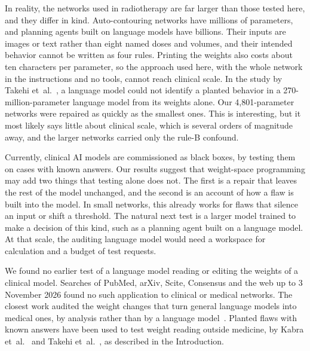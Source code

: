 \documentclass[aps,prx,reprint,superscriptaddress,nofootinbib]{revtex4-2}
\begin{document}
In reality, the networks used in radiotherapy are far larger than those tested here, and they differ
in kind. Auto-contouring networks have millions of parameters, and planning agents built on language
models have billions. Their inputs are images or text rather than eight named doses and volumes, and
their intended behavior cannot be written as four rules. Printing the weights also costs about ten
characters per parameter, so the approach used here, with the whole network in the instructions and
no tools, cannot reach clinical scale. In the study by Takehi et~al.~\cite{takehi2026}, a language
model could not identify a planted behavior in a 270-million-parameter language model from its
weights alone. Our 4,801-parameter networks were repaired as quickly as the smallest ones. This is
interesting, but it most likely says little about clinical scale, which is several orders of
magnitude away, and the larger networks carried only the rule-B confound.

Currently, clinical AI models are commissioned as black boxes, by testing them on cases with known
answers. Our results suggest that weight-space programming may add two things that testing alone
does not. The first is a repair that leaves the rest of the model unchanged, and the second is an
account of how a flaw is built into the model. In small networks, this already works for flaws that
silence an input or shift a threshold. The natural next test is a larger model trained to make a
decision of this kind, such as a planning agent built on a language model. At that scale, the
auditing language model would need a workspace for calculation and a budget of test requests.

We found no earlier test of a language model reading or editing the weights of a clinical model.
Searches of PubMed, arXiv, Scite, Consensus and the web up to 3 November 2026 found no such
application to clinical or medical networks. The closest work audited the weight changes that turn
general language models into medical ones, by analysis rather than by a language
model~\cite{singh2026}. Planted flaws with known answers have been used to test weight reading
outside medicine, by Kabra et~al.~\cite{kabra2026} and Takehi et~al.~\cite{takehi2026}, as described
in the Introduction.
\end{document}
